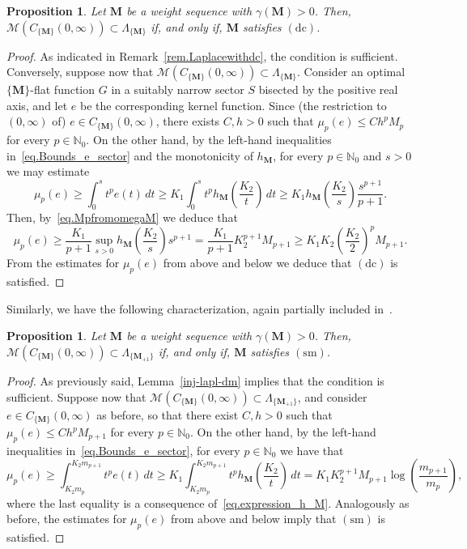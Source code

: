 \documentclass[12pt,a4paper]{article}
\newcommand{\N}{\mathbb{N}}
\newcommand{\CM}{C_{\{\M\}}(0,\infty)}
\newcommand{\M}{{\boldsymbol{M}}}
\newcommand{\dc}{\operatorname{(dc)}}
\newcommand{\sm}{\operatorname{(sm)}}
\newcommand{\ga}{\gamma}
\theoremstyle{plain}
\newtheorem{proposition}[theorem]{Proposition}
\theoremstyle{definition}
\numberwithin{equation}{section}
\begin{document}
\begin{proposition}\label{prop.dc.charact.LambdaM}
Let $\M$ be a weight sequence with $\ga(\M)>0$. Then,
$\mathcal{M}(\CM)\subset\Lambda_{\{\M\}}$ if, and only if, $\M$ satisfies $\dc$.
\end{proposition}
\begin{proof}
As indicated in Remark~\ref{rem.Laplacewithdc}, the condition is sufficient. Conversely, suppose now that $\mathcal{M}(\CM)\subset\Lambda_{\{\M\}}$. Consider an optimal $\{\M\}$-flat function $G$ in a suitably narrow sector $S$ bisected by the positive real axis, and let $e$ be the corresponding kernel function. Since (the restriction to $(0,\infty)$ of) $e\in\CM$, there exists $C,h>0$ such that
$\mu_p(e)\le Ch^pM_p$ for every $p\in\N_0$. On the other hand, by the left-hand inequalities in~\eqref{eq.Bounds_e_sector} and the monotonicity of $h_{\M}$, for every $p\in\N_0$ and $s>0$ we may estimate
$$
\mu_p(e)\ge \int_0^s t^p e(t)\,dt \ge K_1 \int_0^s t^p h_{\M}\left(\frac{K_2}{t}\right)\,dt\ge
K_1 h_{\M}\left(\frac{K_2}{s}\right)\frac{s^{p+1}}{p+1}.
$$
Then, by~\eqref{eq.MpfromomegaM} we deduce that
$$
\mu_p(e)\ge \frac{K_1}{p+1} \sup_{s>0}h_{\M}\left(\frac{K_2}{s}\right)s^{p+1}=
\frac{K_1}{p+1} K_2^{p+1}M_{p+1}\ge
K_1K_2\left(\frac{K_2}{2}\right)^p M_{p+1}.
$$
From the estimates for $\mu_p(e)$ from above and below we deduce that $\dc$ is satisfied.
\end{proof}

Similarly, we have the following characterization, again partially included in~\cite{JimenezMiguelSanzSchindlSurjectSM}.

\begin{proposition}\label{prop.sm.charact.LambdaM+1}
Let $\M$ be a weight sequence with $\ga(\M)>0$. Then,
$\mathcal{M}(\CM)\subset\Lambda_{\{\M_{+1}\}}$ if, and only if, $\M$ satisfies $\sm$.
\end{proposition}

\begin{proof} As previously said, Lemma~\ref{inj-lapl-dm} implies that the condition is sufficient. Suppose now that $\mathcal{M}(\CM)\subset\Lambda_{\{\M_{+1}\}}$, and consider $e\in\CM$ as before, so that there exist $C,h>0$ such that
$\mu_p(e)\le Ch^pM_{p+1}$ for every $p\in\N_0$.
On the other hand, by the left-hand inequalities in~\eqref{eq.Bounds_e_sector}, for every $p\in\N_0$ we have that
	$$
	\mu_p(e)\ge \int_{K_2m_p}^{K_2m_{p+1}} t^p e(t)\,dt \ge K_1 \int_{K_2m_p}^{K_2m_{p+1}} t^p h_{\M}\left(\frac{K_2}{t}\right)\,dt =K_1K_2^{p+1}M_{p+1}\log\left(\frac{m_{p+1}}{m_p}\right),
	$$
where the last equality is a consequence of~\eqref{eq.expression_h_M}. Analogously as before, the estimates for $\mu_p(e)$ from above and below imply that $\sm$ is satisfied.
\end{proof}
\end{document}
